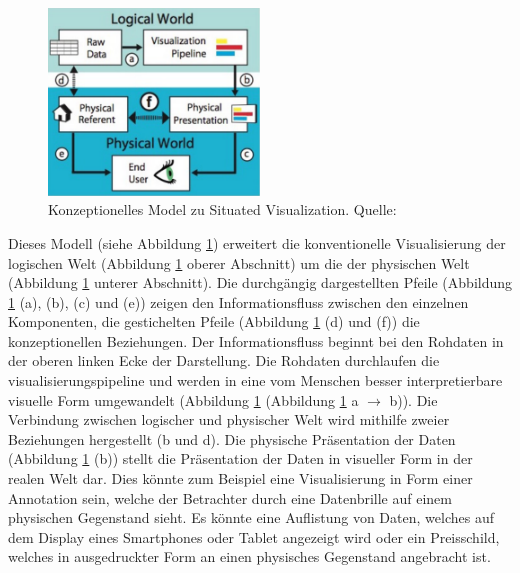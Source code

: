 \begin{figure}[H]
	\centering
	\includegraphics[width=0.5\textwidth]{resources/fundamentals/situated_visualization/spacially_situated_visualization_model.png}
	\caption{Konzeptionelles Model zu Situated Visualization. Quelle: \cite[S.~192]{Marriott2018}}
	\label{img:situated_visualization_concept}
\end{figure}

Dieses Modell (siehe Abbildung \ref{img:situated_visualization_concept}) erweitert die konventionelle Visualisierung der logischen Welt (Abbildung \ref{img:situated_visualization_concept} oberer Abschnitt) um die der physischen Welt (Abbildung \ref{img:situated_visualization_concept} unterer Abschnitt). 
Die durchgängig dargestellten Pfeile (Abbildung \ref{img:situated_visualization_concept} (a), (b), (c) und (e)) zeigen den Informationsfluss zwischen den einzelnen Komponenten, die gestichelten Pfeile (Abbildung \ref{img:situated_visualization_concept} (d) und (f)) die konzeptionellen Beziehungen. Der Informationsfluss beginnt bei den Rohdaten in der oberen linken Ecke der Darstellung. Die Rohdaten durchlaufen die \gls{visualisierungspipeline} und werden in eine vom Menschen besser interpretierbare visuelle Form umgewandelt (Abbildung \ref{img:situated_visualization_concept} (Abbildung \ref{img:situated_visualization_concept} a $\rightarrow$ b)). Die Verbindung zwischen logischer und physischer Welt wird mithilfe zweier Beziehungen hergestellt (b und d). 
Die physische Präsentation der Daten (Abbildung \ref{img:situated_visualization_concept} (b)) stellt die Präsentation der Daten in visueller Form in der realen Welt dar. 
Dies könnte zum Beispiel eine Visualisierung in Form einer Annotation sein, welche der Betrachter durch eine Datenbrille auf einem physischen Gegenstand sieht. Es könnte eine Auflistung von Daten, welches 
auf dem  Display eines Smartphones oder Tablet angezeigt wird oder ein Preisschild, welches in ausgedruckter Form an einen physisches Gegenstand angebracht ist.


